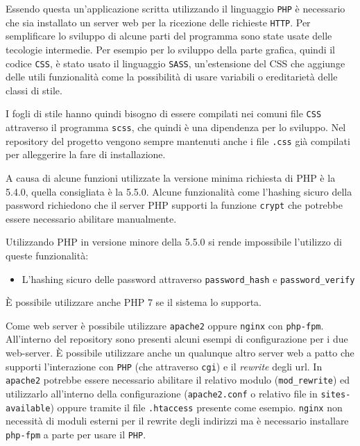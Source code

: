 Essendo questa un'applicazione scritta utilizzando il linguaggio \texttt{PHP} è necessario che sia installato un server web per la ricezione delle richieste \texttt{HTTP}. Per semplificare lo sviluppo di alcune parti del programma sono state usate delle tecologie intermedie. Per esempio per lo sviluppo della parte grafica, quindi il codice \texttt{CSS}, è stato usato il linguaggio \texttt{SASS}, un'estensione del CSS che aggiunge delle utili funzionalità come la possibilità di usare variabili o ereditarietà delle classi di stile.

I fogli di stile hanno quindi bisogno di essere compilati nei comuni file \texttt{CSS} attraverso il programma \texttt{scss}, che quindi è una dipendenza per lo sviluppo. Nel repository del progetto vengono sempre mantenuti anche i file \texttt{.css} già compilati per alleggerire la fare di installazione.

A causa di alcune funzioni utilizzate la versione minima richiesta di PHP è la 5.4.0, quella consigliata è la 5.5.0. Alcune funzionalità come l'hashing sicuro della password richiedono che il server PHP supporti la funzione \texttt{crypt} che potrebbe essere necessario abilitare manualmente.

Utilizzando PHP in versione minore della 5.5.0 si rende impossibile l'utilizzo di queste funzionalità:

\begin{itemize}
	\item L'hashing sicuro delle password attraverso \texttt{password\_hash} e \texttt{password\_verify}
\end{itemize}

È possibile utilizzare anche PHP 7 se il sistema lo supporta.

Come web server è possibile utilizzare \texttt{apache2} oppure \texttt{nginx} con \texttt{php-fpm}. All'interno del repository sono presenti alcuni esempi di configurazione per i due web-server. È possibile utilizzare anche un qualunque altro server web a patto che supporti l'interazione con \texttt{PHP} (che attraverso \texttt{cgi}) e il \emph{rewrite} degli url. In \texttt{apache2} potrebbe essere necessario abilitare il relativo modulo (\texttt{mod\_rewrite}) ed utilizzarlo all'interno della configurazione (\texttt{apache2.conf} o relativo file in \texttt{sites-available}) oppure tramite il file \texttt{.htaccess} presente come esempio. \texttt{nginx} non necessità di moduli esterni per il rewrite degli indirizzi ma è necessario installare \texttt{php-fpm} a parte per usare il \texttt{PHP}.

